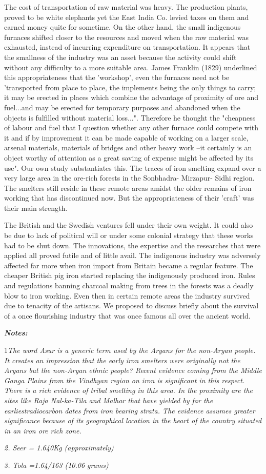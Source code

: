 The cost of transportation of raw material was heavy. The production plants, proved to be white elephants yet the East India Co. levied taxes on them and earned money quite for sometime. On the other hand, the small indigenous furnaces shifted closer to the resources and moved when the raw material was exhausted, instead of incurring expenditure on transportation. It appears that the smallness of the industry was an asset because the activity could shift without any difficulty to a more suitable area. James Franklin (1829) underlined this appropriateness that the 'workshop', even the furnaces need not be 'transported from place to place, the implements being the only things to carry; it may be erected in places which combine the advantage of proximity of ore and fuel...and may be erected for temporary purposes and abandoned when the objects is fulfilled without material loss...". Therefore he thought the "cheapness of labour and fuel that I question whether any other furnace could compete with it and if by improvement it can be made capable of working on a larger scale, arsenal materials, materials of bridges and other heavy work –it certainly is an object worthy of attention as a great saving of expense might be affected by its use". Our own study substantiates this. The traces of iron smelting expand over a very large area in the ore-rich forests in the Sonbhadra- Mirzapur- Sidhi region. The smelters still reside in these remote areas amidst the older remains of iron working that has discontinued now. But the appropriateness of their 'craft' was their main strength.

The British and the Swedish ventures fell under their own weight. It could also be due to lack of political will or under some colonial strategy that these works had to be shut down. The innovations, the expertise and the researches that were applied all proved futile and of little avail. The indigenous industry was adversely affected far more when iron import from Britain became a regular feature. The cheaper British pig iron started replacing the indigenously produced iron. Rules and regulations banning charcoal making from trees in the forests was a deadly blow to iron working. Even then in certain remote areas the industry survived due to tenacity of the artisans. We proposed to discuss briefly about the survival of a once flourishing industry that was once famous all over the ancient world.

\textit{\textbf{Notes:}}

1\textit{The word Asur is a generic term used by the Aryans for the non-Aryan people. It creates an impression that the early iron smelters were originally not the Aryans but the non-Aryan ethnic people? Recent evidence coming from the Middle Ganga Plains from the Vindhyan region on iron is significant in this respect. There is a rich evidence of tribal smelting in this area. In the proximity are the sites like Raja Nal-ka-Tila and Malhar that have yielded by far the earliest}\textit{radiocarbon dates from iron bearing strata. The evidence assumes greater significance because of its geographical location in the heart of the country situated in an iron ore rich zone.}

\textit{2. Seer = 1.640Kg (approximately)}

\textit{3. Tola =1.64/163 (10.06 grams)}

